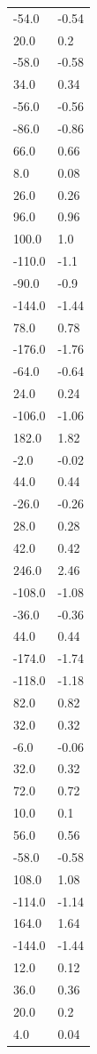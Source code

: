 \begin{longtable}{ll}
-54.0 & -0.54 \\
20.0 & 0.2 \\
-58.0 & -0.58 \\
34.0 & 0.34 \\
-56.0 & -0.56 \\
-86.0 & -0.86 \\
66.0 & 0.66 \\
8.0 & 0.08 \\
26.0 & 0.26 \\
96.0 & 0.96 \\
100.0 & 1.0 \\
-110.0 & -1.1 \\
-90.0 & -0.9 \\
-144.0 & -1.44 \\
78.0 & 0.78 \\
-176.0 & -1.76 \\
-64.0 & -0.64 \\
24.0 & 0.24 \\
-106.0 & -1.06 \\
182.0 & 1.82 \\
-2.0 & -0.02 \\
44.0 & 0.44 \\
-26.0 & -0.26 \\
28.0 & 0.28 \\
42.0 & 0.42 \\
246.0 & 2.46 \\
-108.0 & -1.08 \\
-36.0 & -0.36 \\
44.0 & 0.44 \\
-174.0 & -1.74 \\
-118.0 & -1.18 \\
82.0 & 0.82 \\
32.0 & 0.32 \\
-6.0 & -0.06 \\
32.0 & 0.32 \\
72.0 & 0.72 \\
10.0 & 0.1 \\
56.0 & 0.56 \\
-58.0 & -0.58 \\
108.0 & 1.08 \\
-114.0 & -1.14 \\
164.0 & 1.64 \\
-144.0 & -1.44 \\
12.0 & 0.12 \\
36.0 & 0.36 \\
20.0 & 0.2 \\
4.0 & 0.04 \\

\end{longtable}
